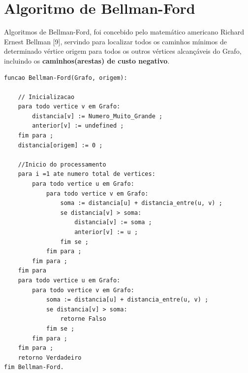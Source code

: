 \documentclass[a4paper,10pt]{article}
\begin{document}
\section{Algoritmo de Bellman-Ford}{
 Algoritmos de Bellman-Ford\cite{5}, foi concebido pelo matemático americano Richard Ernest Bellman [9], servindo para localizar todos os caminhos mínimos
de determinado vértice origem para todos os outros vértices alcançáveis do Grafo, incluindo os \textbf{caminhos(arestas) de custo negativo}.

\begin{lstlisting}[morekeywords={*,:,:,[,], se, de, para, todo, fim para, enquanto, nao, eh, retorne}, captionpos=b]
funcao Bellman-Ford(Grafo, origem):

    // Inicializacao
    para todo vertice v em Grafo:
        distancia[v] := Numero_Muito_Grande ;
        anterior[v] := undefined ;
    fim para ;
    distancia[origem] := 0 ;

    //Inicio do processamento
    para i =1 ate numero total de vertices:
        para todo vertice u em Grafo:              
            para todo vertice v em Grafo:
                soma := distancia[u] + distancia_entre(u, v) ;
                se distancia[v] > soma:  
                    distancia[v] := soma ;
                    anterior[v] := u ;
                fim se ;
            fim para ;
        fim para ;
    fim para
    para todo vertice u em Grafo:              
        para todo vertice v em Grafo:
            soma := distancia[u] + distancia_entre(u, v) ;
            se distancia[v] > soma:
                retorne Falso
            fim se ;
        fim para ;
    fim para ;
    retorno Verdadeiro 
fim Bellman-Ford.
\end{lstlisting}
}
\end{document}
